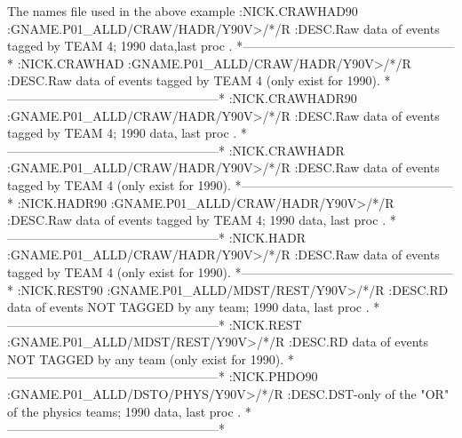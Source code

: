 \begin{XMPt}{The names file used in the above example}
:NICK.CRAWHAD90                                                         
:GNAME.P01_ALLD/CRAW/HADR/Y90V>/*/R                                     
:DESC.Raw data of events tagged by TEAM 4; 1990 data,last proc .        
*---------------------------------------------------*                   
:NICK.CRAWHAD                                                           
:GNAME.P01_ALLD/CRAW/HADR/Y90V>/*/R                                     
:DESC.Raw data of events tagged by TEAM 4 (only exist for 1990).        
*---------------------------------------------------*                   
:NICK.CRAWHADR90                                                        
:GNAME.P01_ALLD/CRAW/HADR/Y90V>/*/R                                     
:DESC.Raw data of events tagged by TEAM 4; 1990 data, last proc .       
*---------------------------------------------------*                   
:NICK.CRAWHADR                                                          
:GNAME.P01_ALLD/CRAW/HADR/Y90V>/*/R                                     
:DESC.Raw data of events tagged by TEAM 4 (only exist for 1990).        
*---------------------------------------------------*                   
:NICK.HADR90                                                            
:GNAME.P01_ALLD/CRAW/HADR/Y90V>/*/R                                     
:DESC.Raw data of events tagged by TEAM 4; 1990 data, last proc .       
*---------------------------------------------------*                   
:NICK.HADR                                                              
:GNAME.P01_ALLD/CRAW/HADR/Y90V>/*/R                                     
:DESC.Raw data of events tagged by TEAM 4 (only exist for 1990).        
*---------------------------------------------------*                   
:NICK.REST90                                                            
:GNAME.P01_ALLD/MDST/REST/Y90V>/*/R                                     
:DESC.RD data of events NOT TAGGED by any team; 1990 data, last proc .  
*---------------------------------------------------*                   
:NICK.REST                                                              
:GNAME.P01_ALLD/MDST/REST/Y90V>/*/R                                     
:DESC.RD data of events NOT TAGGED by any team (only exist for 1990).   
*---------------------------------------------------*                   
:NICK.PHDO90                                                            
:GNAME.P01_ALLD/DSTO/PHYS/Y90V>/*/R                                     
:DESC.DST-only of the "OR" of the physics teams; 1990 data, last proc . 
*---------------------------------------------------*                   

\end{XMPt}
